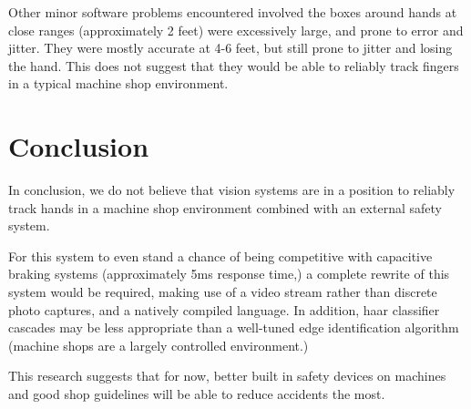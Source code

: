\documentclass[12pt]{article}
\begin{document}
Other minor software problems encountered involved the boxes around hands at close ranges (approximately 2 feet) were excessively large, and prone to error and jitter. They were mostly accurate at 4-6 feet, but still prone to jitter and losing the hand. This does not suggest that they would be able to reliably track fingers in a typical machine shop environment.

\section{Conclusion}
In conclusion, we do not believe that vision systems are in a position to reliably track hands in a machine shop environment combined with an external safety system.

For this system to even stand a chance of being competitive with capacitive braking systems (approximately 5ms response time,) a complete rewrite of this system would be required, making use of a video stream rather than discrete photo captures, and a natively compiled language. In addition, haar classifier cascades may be less appropriate than a well-tuned edge identification algorithm (machine shops are a largely controlled environment.)

This research suggests that for now, better built in safety devices on machines and good shop guidelines will be able to reduce accidents the most.



\end{document}
